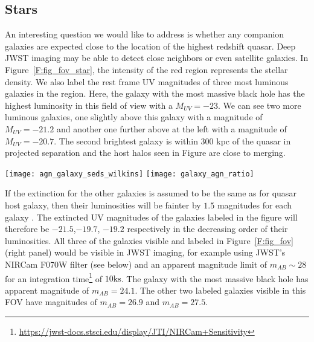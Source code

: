 \documentclass[twocolumn,useAMS,usenatbib]{mnras} \usepackage{natbib}
\begin{document}
\subsection{Stars} 

An interesting question we would like to address is whether any companion galaxies are expected close to the location of the highest redshift quasar. Deep JWST imaging may be able to detect close neighbors or even satellite galaxies. 
In Figure~\ref{F:fig_fov_star}, the intensity of the red region represents the stellar density. We also label the rest frame UV magnitudes of three most luminous galaxies in the region. Here, the galaxy with the most massive black hole has the highest luminosity in this field of view with a $M_{UV}=-23$. We can see two more luminous galaxies, one slightly above this galaxy with a magnitude of $M_{UV} = -21.2$ and another one further above at the left with a magnitude of $M_{UV}=-20.7$. The second brightest galaxy is within 300 kpc of the
quasar in projected separation and the host halos seen in Figure 
are close to merging.


\begin{figure*}
\begin{center}
\texttt{[image: agn\_galaxy\_seds\_wilkins]}
\texttt{[image: galaxy\_agn\_ratio]}
\caption{\label{F:fig_sed} {\em Left:} The figure shows the SED's of AGN and the star particles in the galaxy hosting the brightest quasar at $z=7.6$ . The green and black lines show the continuum and emission spectrum of the quasar obtained from the {\em Cloudy} software. The red line shows the galaxy's intrinsic spectrum obtained by summing the individual SED's of star particles in the galaxy. The cyan line shows the dust-attenuated spectrum of the galaxy {\em Right:} The figure shows the ratio of the galaxy luminosity to that of the AGN as a function of wavelength. The red and cyan line correspond to the intrinsic and dust-attenuated spectrum of the galaxy respectively. The gray horizontal line represents the value at the which the AGN luminosity is about 30 times brighter than the galaxy. 
}  
\end{center}
\end{figure*}

If the extinction for the other galaxies is assumed to be the same as for quasar host galaxy, then their luminosities will be fainter by $1.5$ magnitudes for each galaxy .  The extincted UV magnitudes of the galaxies labeled in the figure will therefore be $-21.5$,$-19.7$, $-19.2$ respectively in the decreasing order of their luminosities.
All three of the galaxies visible and labeled in Figure~\ref{F:fig_fov} (right panel)  would be visible in JWST imaging, for example using JWST's NIRCam F070W filter (see below) and an apparent magnitude limit of  $m_{AB} \sim28$ for an integration time\footnote{\url{https://jwst-docs.stsci.edu/display/JTI/NIRCam+Sensitivity}} of $10\mathrm{ks}$. The galaxy with the most massive black hole has apparent magnitude of $m_{AB} = 24.1$. The other two labeled galaxies visible in this FOV have magnitudes of $m_{AB} = 26.9$ and $m_{AB} = 27.5$.
\end{document}
